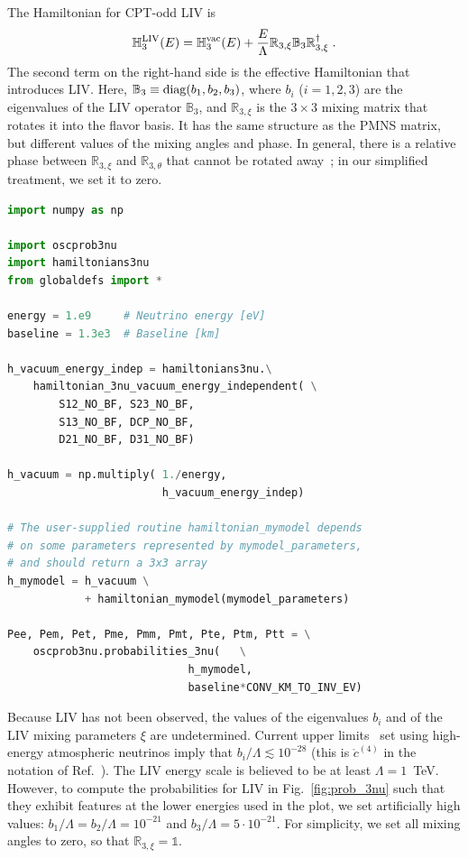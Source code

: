 \documentclass[final,5p,times,twocolumn]{elsarticle}
\newcommand{\fig}{Fig.}
\newcommand{\Ref}{Ref.}
\newcommand{\figu}[1]{\fig~\ref{fig:#1}}
\begin{document}
The Hamiltonian for CPT-odd LIV is\ \cite{Coleman:1998ti, Kostelecky:2003xn, Dighe:2008bu}
\begin{equation}
 \label{equ:h3_liv}
 \mathbb{H}_3^{\rm LIV}(E)
 = 
 \mathbb{H}_3^{\rm vac}(E)
 + 
 \frac{E}{\Lambda} \mathbb{R}_{3,\xi} \mathbb{B}_3 \mathbb{R}_{3,\xi}^\dagger \;.
\end{equation}
The second term on the right-hand side is the effective Hamiltonian that introduces LIV.  Here, $\mathbb{B}_3 \equiv {\rm diag}(b_1, b_2, b_3)$, where $b_i$ ($i=1,2,3$) are the eigenvalues of the LIV operator $\mathbb{B}_3$, and $\mathbb{R}_{3,\xi}$ is the $3 \times 3$ mixing matrix that rotates it into the flavor basis.  It has the same structure as the PMNS matrix, but different values of the mixing angles and phase.  In general, there is a relative phase between $\mathbb{R}_{3,\xi}$ and $\mathbb{R}_{3,\theta}$ that cannot be rotated away\ \cite{GonzalezGarcia:2004wg, GonzalezGarcia:2005xw}; in our simplified treatment, we set it to zero.

\begin{lstlisting}[language=Python, caption={Template to use {\tt NuOscProbExact} to compute probabilities for three-neutrino oscillations with an arbitrary, user-supplied Hamiltonian}, label={lst:3nu_arbitrary}, float]
import numpy as np

import oscprob3nu
import hamiltonians3nu
from globaldefs import *

energy = 1.e9     # Neutrino energy [eV]
baseline = 1.3e3  # Baseline [km]

h_vacuum_energy_indep = hamiltonians3nu.\
    hamiltonian_3nu_vacuum_energy_independent( \
        S12_NO_BF, S23_NO_BF,
        S13_NO_BF, DCP_NO_BF,
        D21_NO_BF, D31_NO_BF)
        
h_vacuum = np.multiply( 1./energy, 
                        h_vacuum_energy_indep)

# The user-supplied routine hamiltonian_mymodel depends
# on some parameters represented by mymodel_parameters,
# and should return a 3x3 array
h_mymodel = h_vacuum \
            + hamiltonian_mymodel(mymodel_parameters)

Pee, Pem, Pet, Pme, Pmm, Pmt, Pte, Ptm, Ptt = \
    oscprob3nu.probabilities_3nu(   \
                            h_mymodel,
                            baseline*CONV_KM_TO_INV_EV)
\end{lstlisting}

Because LIV has not been observed, the values of the eigenvalues $b_i$ and of the LIV mixing parameters $\xi$ are undetermined.  Current upper limits\ \cite{Aartsen:2017ibm} set using high-energy atmospheric neutrinos imply that $b_i/\Lambda \lesssim 10^{-28}$ (this is $\mathring{c}^{(4)}$ in the notation of \Ref\ \cite{Aartsen:2017ibm}).  The LIV energy scale is believed to be at least $\Lambda = 1$~TeV.  However, to compute the probabilities for LIV in \figu{prob_3nu} such that they exhibit features at the lower energies used in the plot, we set artificially high values: $b_1/\Lambda = b_2/\Lambda = 10^{-21}$ and $b_3/\Lambda = 5 \cdot 10^{-21}$.  For simplicity, we set all mixing angles to zero, so that $\mathbb{R}_{3,\xi} = \mathbb{1}$.
\end{document}
